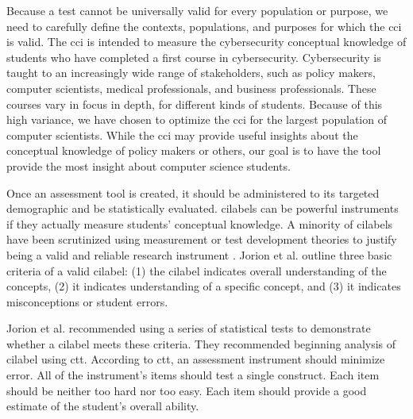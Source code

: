 
Because a test cannot be universally valid for every population or purpose, we need to carefully define the contexts, populations, and purposes for which the \gls{cci} is valid. The \gls{cci} is intended to measure the cybersecurity conceptual knowledge of students who have completed a first course in cybersecurity. Cybersecurity is taught to an increasingly wide range of stakeholders, such as policy makers, computer scientists, medical professionals, and business professionals. These courses vary in focus in depth, for different kinds of students. Because of this high variance, we have chosen to optimize the \gls{cci} for the largest population of computer scientists. While the \gls{cci} may provide useful insights about the conceptual knowledge of policy makers or others, our goal is to have the tool provide the most insight about computer science students. 

Once an assessment tool is created, it should be administered to its targeted demographic and be statistically evaluated. \glspl{cilabel} can be powerful instruments if they actually measure students' conceptual knowledge. A minority of \glspl{cilabel} have been scrutinized using measurement or test development theories to justify being a valid and reliable research instrument \cite{dlci}. Jorion et al. \cite{jorian} outline three basic criteria of a valid \gls{cilabel}: (1) the \gls{cilabel} indicates overall understanding of the concepts, (2) it indicates understanding of a specific concept, and (3) it indicates misconceptions or student errors.

 Jorion et al. recommended using a series of statistical tests to demonstrate whether a \gls{cilabel} meets these criteria. They recommended beginning analysis of \gls{cilabel} using \gls{ctt}. According to \gls{ctt}, an assessment instrument should minimize error. All of the instrument's items should test a single construct. Each item should be neither too hard nor too easy. Each item should provide a good estimate of the student's overall ability.
 
